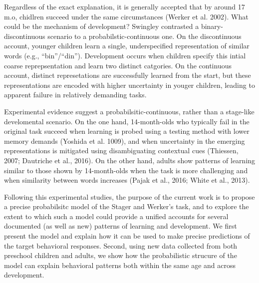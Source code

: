 \documentclass[10pt, letterpaper]{article}
\begin{document}
Regardless of the exact explanation, it is generally accepted that by
around 17 m.o, chidlren succeed under the same circumstances (Werker et
al. 2002). What could be the mechanism of development? Swingley
contrasted a binary-discontinuous scenario to a probabilstic-continuous
one. On the discontinuous account, younger children learn a single,
underspecified representation of similar words (e.g., ``bin''/``din'').
Development occurs when children specify this intial coarse
reprepsentation and learn two distinct catgories. On the continuous
account, distinct represetations are successfully learned from the
start, but these representations are encoded with higher uncertainty in
youger children, leading to apparent failure in relatively demanding
tasks.

Experimental evidence suggest a probabilsitic-continuous, rather than a
stage-like develomental scenario. On the one hand, 14-month-olds who
typically fail in the original task succeed when learning is probed
using a testing method with lower memory demands (Yoshida et al. 1009),
and when uncertainty in the emerging representations is mitigated using
disambiguating contextual cues (Thiessen, 2007; Dautriche et al., 2016).
On the other hand, adults show patterns of learning similar to those
shown by 14-month-olds when the task is more challenging and when
similarity between words increases (Pajak et al., 2016; White et al.,
2013).

Following this experimental studies, the purpose of the current work is
to propose a precise probabilsitc model of the Stager and Werker's task,
and to explore the extent to which such a model could provide a unified
accounts for several documented (as well as new) patterns of learning
and development. We first present the model and explain how it can be
used to make precise predictions of the target behavioral responses.
Second, using new data collected from both preschool children and
adults, we show how the probabilistic strucure of the model can explain
behavioral patterns both within the same age and across development.
\end{document}
